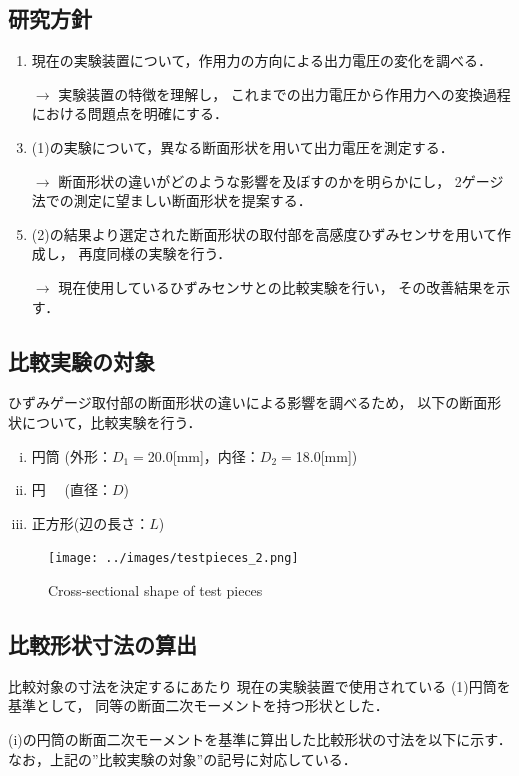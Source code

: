 \documentclass[twocolumn,a4j]{jsarticle}
\begin{document}
\subsection{研究方針}
\begin{enumerate}[(1)]
    \item 現在の実験装置について，作用力の方向による出力電圧の変化を調べる．
    \item [$\rightarrow$] 実験装置の特徴を理解し，
          これまでの出力電圧から作用力への変換過程における問題点を明確にする．
    \item (1)の実験について，異なる断面形状を用いて出力電圧を測定する．
    \item [$\rightarrow$] 断面形状の違いがどのような影響を及ぼすのかを明らかにし，
          2ゲージ法での測定に望ましい断面形状を提案する．
    \item (2)の結果より選定された断面形状の取付部を高感度ひずみセンサを用いて作成し，
          再度同様の実験を行う．
    \item [$\rightarrow$] 現在使用しているひずみセンサとの比較実験を行い，
          その改善結果を示す．
\end{enumerate}

\subsection{比較実験の対象}
ひずみゲージ取付部の断面形状の違いによる影響を調べるため，
以下の断面形状について，比較実験を行う．\par
\begin{enumerate}[(i)]
    \item 円筒  (外形：$D_1=$20.0[mm]，内径：$D_2=$18.0[mm])
    \item 円　  (直径：$D$)
    \item 正方形(辺の長さ：$L$)
\end{enumerate}
\begin{figure}[htbp]
    \footnotesize
    \begin{center}
        \texttt{[image: ../images/testpieces\_2.png]}
        \caption{Cross-sectional shape of test pieces}
    \end{center}
\end{figure}

\newpage

\subsection{比較形状寸法の算出}
比較対象の寸法を決定するにあたり
現在の実験装置で使用されている (1)円筒を基準として，
同等の断面二次モーメントを持つ形状とした．\par
(i)の円筒の断面二次モーメントを基準に算出した比較形状の寸法を以下に示す．
なお，上記の”比較実験の対象”の記号に対応している．\\
\end{document}
